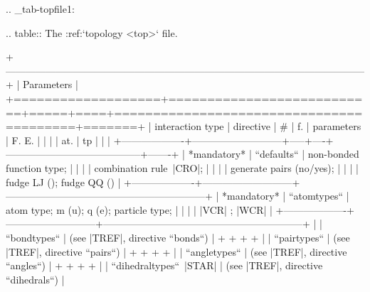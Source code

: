 .. _tab-topfile1:

.. table:: The :ref:`topology <top>` file.

        +------------------------------------------------------------------------------------------------------------+
        | Parameters                                                                                                 |
        +===================+===========================+=====+====+=========================================+=======+
        | interaction type  | directive                 | #   | f. | parameters                              | F. E. |
        |                   |                           | at. | tp |                                         |       |
        +-------------------+---------------------------+-----+----+-----------------------------------------+-------+
        | *mandatory*       | ``defaults``              |            non-bonded function type;                       |
        |                   |                           |            combination rule\ |CRO|;                        |
        |                   |                           |            generate pairs (no/yes);                        |
        |                   |                           |            fudge LJ (); fudge QQ ()                        |
        +-------------------+---------------------------+------------------------------------------------------------+
        | *mandatory*       | ``atomtypes``             |            atom type; m (u); q (e); particle type;         | 
        |                   |                           |            |VCR| ; |WCR|                                   |
        +-------------------+---------------------------+------------------------------------------------------------+
        |                   | ``bondtypes``             |  (see |TREF|, directive ``bonds``)                         |
        +                   +                           +                                                            +
        |                   | ``pairtypes``             |  (see |TREF|, directive ``pairs``)                         |
        +                   +                           +                                                            +
        |                   | ``angletypes``            |  (see |TREF|, directive ``angles``)                        |
        +                   +                           +                                                            +
        |                   | ``dihedraltypes``\ |STAR| |  (see |TREF|, directive ``dihedrals``)                     |
